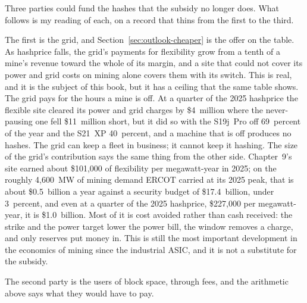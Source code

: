 Three parties could fund the hashes that the subsidy no longer does. What follows is my reading of each, on a record that thins from the first to the third.

The first is the grid, and Section~\ref{sec:outlook-cheaper} is the offer on the table. As hashprice falls, the grid's payments for flexibility grow from a tenth of a mine's revenue toward the whole of its margin, and a site that could not cover its power and grid costs on mining alone covers them with its switch. This is real, and it is the subject of this book, but it has a ceiling that the same table shows. The grid pays for the hours a mine is off. At a quarter of the 2025 hashprice the flexible site cleared its power and grid charges by \$4~million where the never-pausing one fell \$11~million short, but it did so with the S19j~Pro off 69~percent of the year and the S21~XP 40~percent, and a machine that is off produces no hashes. %
The grid can keep a fleet in business; it cannot keep it hashing. The size of the grid's contribution says the same thing from the other side. Chapter~9's site earned about \$101,000 of flexibility per megawatt-year in 2025; on the roughly 4,600~MW of mining demand ERCOT carried at its 2025 peak, that is about \$0.5~billion a year against a security budget of \$17.4~billion, under 3~percent, and even at a quarter of the 2025 hashprice, \$227,000 per megawatt-year, it is \$1.0~billion. Most of it is cost avoided rather than cash received: the strike and the power target lower the power bill, the window removes a charge, and only reserves put money in. %
This is still the most important development in the economics of mining since the industrial ASIC, and it is not a substitute for the subsidy.

The second party is the users of block space, through fees, and the arithmetic above says what they would have to pay.

